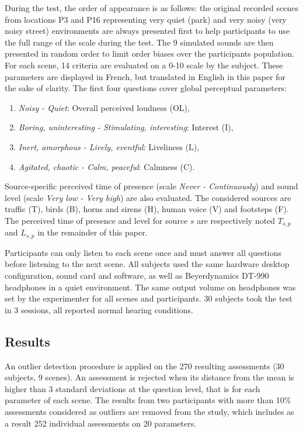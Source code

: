 \documentclass{article}
\begin{document}
\begin{sloppy}
During the test, the order of appearance is as follows: the original recorded scenes from locations P3 and P16 representing very quiet (park) and very noisy (very noisy street) environments are always presented first to help participants to use the full range of the scale during the test. The 9 simulated sounds are then presented in random order to limit order biases over the participants population. For each scene, 14 criteria are evaluated on a 0-10 scale by the subject. These parameters are displayed in French, but translated in English in this paper for the sake of clarity. The first four questions cover global perceptual parameters:
\begin{enumerate}
\item \textit{Noisy - Quiet}: Overall perceived loudness (OL),
\item \textit{Boring, uninteresting - Stimulating, interesting}: Interest (I),
\item \textit{Inert, amorphous - Lively, eventful}: Liveliness (L),
\item \textit{Agitated, chaotic - Calm, peaceful}: Calmness (C).
\end{enumerate}
Source-specific perceived time of presence (scale \textit{Never - Continuously}) and sound level (scale \textit{Very low - Very high}) are also evaluated. The considered sources are traffic (T), birds (B), horns and sirens (H), human voice (V) and footsteps (F). The perceived time of presence and level for source $s$ are respectively noted $T_{s,p}$ and $L_{s,p}$ in the remainder of this paper.

Participants can only listen to each scene once and must answer all questions before listening to the next scene. All subjects used the same hardware desktop configuration, sound card and software, as well as Beyerdynamics DT-990 headphones in a quiet environment. The same output volume on headphones was set by the experimenter for all scenes and participants. 30 subjects took the test in 3 sessions, all reported normal hearing conditions.

\subsection{Results}


An outlier detection procedure is applied on the 270 resulting assessments (30 subjects, 9 scenes). An assessment is rejected when its distance from the mean is higher than 3 standard deviations at the question level, that is for each parameter of each scene. The results from two participants with more than 10\% assessments considered as outliers are removed from the study, which includes as a result 252 individual assessments on 20 parameters.


\end{sloppy}
\end{document}
